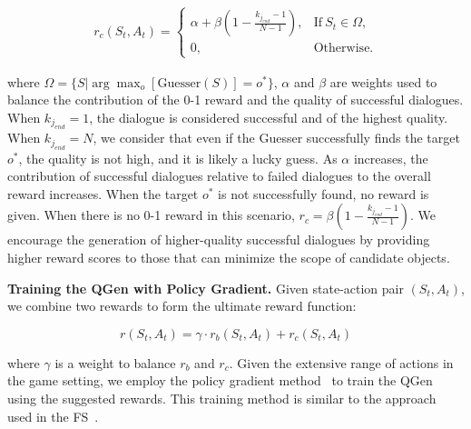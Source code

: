 \setlength{\abovedisplayskip}{3pt}
\begin{small}
\begin{equation}
\begin{aligned}
r_c\left( S_t,A_t \right) =\begin{cases}
	\alpha 
 +\beta  
 \left( 1-\frac{k_{j_{end}}-1}{N-1} \right), &\mathrm{If\ } S_t \in \Omega, \\
	0, &\mathrm{Otherwise}.
\end{cases}
\end{aligned}
\end{equation}
\end{small}
where $\Omega=\{S|\arg\max_o[\mathrm{Guesser}(S)]=o^*\}$, $\alpha $ and $\beta $ are weights used to balance the contribution of the 0-1 reward and the quality of successful dialogues. When $k_{j_{end}}=1$, the dialogue is considered successful and of the highest quality. When $k_{j_{end}}=N$, we consider that even if the Guesser successfully finds the target $o^*$, the quality is not high, and it is likely a lucky guess. As $\alpha $ increases, the contribution of successful dialogues relative to failed dialogues to the overall reward increases. When the target $o^*$ is not successfully found, no reward is given.
When there is no 0-1 reward in this scenario, $r_c =\beta \left( 1-\frac{k_{j_{end}}-1}{N-1} \right) $. 
We encourage the generation of higher-quality successful dialogues by providing higher reward scores to those that can minimize the scope of candidate objects. 

\textbf{Training the QGen with Policy Gradient.} Given state-action pair $\left( S_t,A_t \right) $, we combine two rewards to form the ultimate reward function:

\setlength{\abovedisplayskip}{3pt}
\begin{small}
\begin{equation}
r\left( S_t,A_t \right) =\gamma \cdot r_b\left( S_t,A_t \right) +r_c\left( S_t,A_t \right) 
\end{equation}
\end{small}
where $\gamma$ is a weight to balance $r_b$ and $r_c$. Given the extensive range of actions in the game setting, we employ the policy gradient method~\cite{1999Policy} to train the QGen using the suggested rewards. This training method is similar to the approach used in the FS~\cite{strub2017end}.


